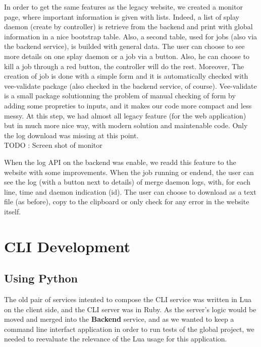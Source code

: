 \documentclass{eplmastersthesis}
\begin{document}
        In order to get the same features as the legacy website, we created a
        monitor page, where important information is given with lists. Indeed,
        a list of splay daemon (create by controller) is retrieve from the
        backend and print with global information in a nice bootstrap table.
        Also, a second table, used for jobs (also via the backend service), is
        builded with general data. The user can choose to see more details on
        one splay daemon or a job via a button. Also, he can choose to kill a
        job through a red button, the controller will do the rest. Moreover, The creation of job is done
        with a simple form and it is automatically checked with vee-validate
        package \cite{VeeValidate} (also checked in the backend service, of
        course). Vee-validate is a small package solutionning the problem of
        manual checking of form by adding some propreties to inputs, and it
        makes our code more compact and less messy. At this step, we had
        almost all legacy feature (for the web application) but in much more
        nice way, with modern solution and maintenable code. Only the log
        download was missing at this point. \\
        {\color{red} TODO : Screen shot of monitor}

        When the log API on the backend was enable, we readd this feature to the website with some
        improvements. When the job running or endend, the user can see the log (with a button next to details)
        of merge daemon logs, with, for each line, time and daemon indication (id). The user can choose to
        download as a text file (as before), copy to the clipboard or only check for any error in
        the website itself. 

    \section{CLI Development}

      \subsection{Using Python}

        The old pair of services intented to compose the CLI service was
        written in Lua on the client side, and the CLI server was in Ruby. As
        the server's logic would be moved and merged into the \textbf{Backend}
        service, and as we wanted to keep a command line interfact application
        in order to run tests of the global project, we needed to reevaluate
        the relevance of the Lua usage for this application.\\
\end{document}
